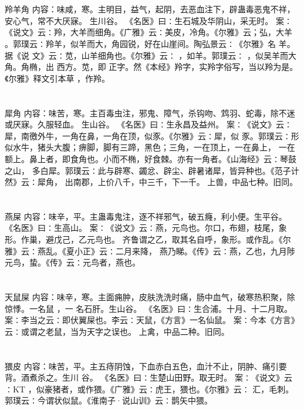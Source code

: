 \documentclass[12pt,UTF8]{ctexbook}
\begin{document}
\section{}羚羊角
内容：味咸，寒。主明目，益气，起阴，去恶血注下，辟蛊毒恶鬼不祥，安心气，常不大厌寐。 
生川谷。 
《名医》曰∶生石城及华阴山，采无时。 
案∶《说文》云∶羚，大羊而细角。《广雅》云∶美皮，冷角。《尔雅》云；弘，大羊 
。郭璞云∶羚羊，似羊而大，角园锐，好在山崖间。陶弘景云∶《尔雅》名 羊。据《说 
文》云∶苋，山羊细角也。《尔雅》云∶ ，如羊。郭璞云∶ ，似吴羊而大角。角椭，出 
西方。苋，即 正字。然《本经》羚字，实羚字俗写，当以羚为是。《尔雅》释文引本草 
，作羚。 


\section{}犀角
内容：味苦，寒。主百毒虫注，邪鬼、障气，杀钩吻、鸩羽、蛇毒，除不迷或厌寐。久服轻血。 
生山谷。 
《名医》曰∶生永昌及益州。 
案∶《说文》云∶犀，南徼外牛，一角在鼻，一角在顶，似豕。《尔雅》云∶犀，似 
豕。郭璞云∶形似水牛，猪头大腹；痹脚，脚有三蹄，黑色；三角，一在顶上，一在鼻上， 
一在额上。鼻上者，即食角也。小而不椭，好食棘。亦有一角者。《山海经》云∶琴鼓之山， 
多白犀。郭璞云∶此与辟寒、蠲忿、辟尘、辟暑诸犀，皆异种也。《范子计然》云∶犀角， 
出南郡，上价八千，中三千，下一千。 
上兽，中品七种。旧同。 


\section{}燕屎
内容：味辛，平。主蛊毒鬼注，逐不祥邪气，破五癃，利小便。生平谷。 
《名医》曰∶生高山。 
案∶《说文》云∶燕，元鸟也。尔口，布翅，枝尾，象形。作巢，避戊己，乙元鸟也。 
齐鲁谓之乙，取其名自呼，象形。或作乱。《尔雅》云∶燕乱。《夏小正》云∶二月来降， 
燕乃睇。《传》云∶燕，乙也，九月陟元鸟，蛰。《传》云∶元鸟者，燕也。 


\section{}天鼠屎
内容：味辛，寒。主面痈肿，皮肤洗洗时痛，肠中血气，破寒热积聚，除惊悸。一名鼠 ，一 
名石肝。生山谷。 
《名医》曰∶生合浦。十月、十二月取。 
案∶李当之云∶即伏翼屎也。李云∶天鼠，《方言》一名仙鼠。 
案∶今本《方言》云∶或谓之老鼠，当为天字之误也。 
上禽，中品二种。旧同。 


\section{}猥皮
内容：味苦，平。主五痔阴蚀，下血赤白五色，血汁不止，阴肿、痛引要背。酒煮杀之。生川 
谷。 
《名医》曰∶生楚山田野。取无时。 
案∶《说文》云∶KT ，似豪猪者，或作猥。《广雅》云∶虎王，猥也。《尔雅》云∶ 
汇，毛刺。郭璞云∶今谓状似鼠。《淮南子·说山训》云∶鹊矢中猥。 
\end{document}
